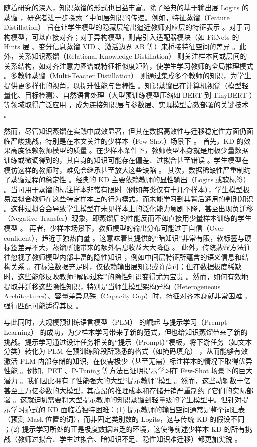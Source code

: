 \documentclass[../main.tex]{subfiles}
\begin{document}
随着研究的深入，知识蒸馏的形式也日益丰富。除了经典的基于输出层 Logits 的蒸馏 ，研究者进一步探索了中间层知识的传递。例如，特征蒸馏（Feature Distillation） 旨在让学生模型的隐藏层输出逼近教师对应层的特征表示 。对于同构模型，可以直接对齐；对于异构模型，则需引入适配器模块（如 FitNets 的 Hints 层 、变分信息蒸馏 VID 、激活边界 AB 等）来桥接特征空间的差异 。此外，关系知识蒸馏（Relational Knowledge Distillation） 则关注样本间或层间的关系结构，如对齐注意力图谱或特征相似度矩阵，使学生学习教师的全局推理模式 。多教师蒸馏（Multi-Teacher Distillation） 则通过集成多个教师的知识，为学生提供更多样化的视角，以提升性能与鲁棒性 。知识蒸馏已在计算机视觉（模型轻量化、目标检测）、自然语言处理（大型预训练模型压缩如 BERT 到 TinyBERT ）等领域取得广泛应用 ，成为连接知识层与参数层、实现模型高效部署的关键技术 。

然而，尽管知识蒸馏在实践中成效显著，但其在数据高效性与迁移稳定性方面仍面临严峻挑战，特别是在本文关注的少样本（Few-Shot）场景下 。 首先，KD 的效果高度依赖教师模型的质量 。在少样本条件下，教师模型本身就是用极少量数据训练或微调得到的，其自身的知识可能存在偏差、过拟合甚至错误 。学生模型在模仿这样的教师时，难免会继承甚至放大这些缺陷 。 其次，数据稀缺性严重制约了蒸馏过程的稳定性 。经典的 KD 主要依赖教师的显性输出（Logits 或软标签） 。当可用于蒸馏的标注样本非常有限时（例如每类仅有十几个样本），学生模型极易过拟合教师在这些特定样本上的行为模式，而未能学习到其背后通用的判别知识 。这种过拟合会导致学生模型在未见样本上的泛化能力急剧下降，甚至出现负迁移（Negative Transfer）现象，即蒸馏后的性能反而不如直接用少量样本训练的学生模型 。 再者，少样本场景下，教师模型的输出分布可能过于自信（Over-confident），趋近于独热向量 。这意味着其提供的“暗知识”非常有限，软标签与硬标签差异不大，蒸馏所能带来的额外信息收益大大降低 。 此外，传统蒸馏方法往往忽视了教师模型内部丰富的隐性知识 ，例如中间层特征所蕴含的语义信息和结构关系 。在标注数据充足时，仅依赖输出层知识或许尚可；但在数据极度稀缺时，这些能够反映教师“解题过程”的隐性知识变得尤为宝贵 。然而，如何有效地提取并迁移这些隐性知识，特别是当师生模型架构异构（Heterogeneous Architectures）、容量差异悬殊（Capacity Gap）时，特征对齐本身就非常困难 ，强行匹配可能适得其反 。

与此同时，大规模预训练语言模型（PLM） 的崛起 与提示学习（Prompt Learning） 的成功，为少样本学习带来了新的范式，但也给知识蒸馏带来了新的挑战。提示学习通过设计任务相关的“提示（Prompt）”模板，将下游任务（如文本分类）转化为 PLM 在预训练阶段所熟悉的格式（如掩码填充） ，从而能够有效激活 PLM 内部存储的知识，在仅需极少（甚至无需）标注样本的情况下取得优异性能 。例如，PET 、P-Tuning 等方法已证明提示学习在 Few-Shot 场景下的巨大潜力 。我们因此拥有了性能强大的大型“提示教师”模型 。然而，这些动辄数十亿甚至上万亿参数的大模型，其高昂的推理成本和存储开销严重制约了它们的实际部署 。这就迫切需要将大型提示教师的知识蒸馏到轻量级的学生模型中。但针对提示学习范式的 KD 面临着独特困难：(1) 提示教师的输出空间通常是整个词汇表（预测 Mask 位置的词），而非固定类别数的 Logits，这与传统 KD 的假设不同 ；(2) 提示学习所处的正是极度数据匮乏的环境，这使得前述少样本 KD 的所有挑战（教师过拟合、学生过拟合、暗知识不足、隐性知识难迁移）都更加尖锐 。
\end{document}
